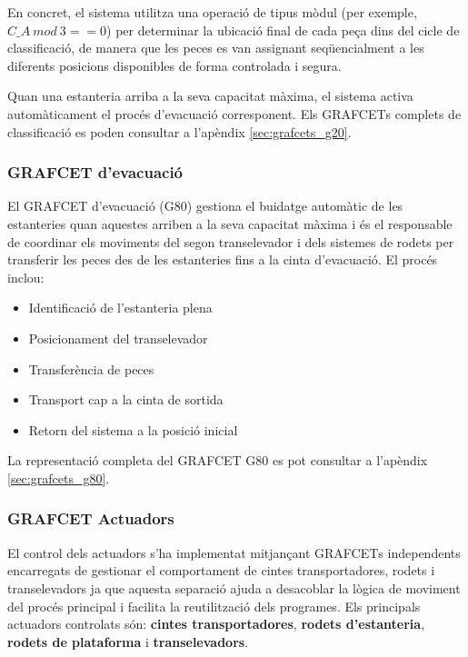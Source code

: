 \documentclass[a4paper,11pt,DIV=13,headings=normal,abstract=true,twoside=semi]{article}
\newcommand{\acro}[1]{\textsc{#1}}
\begin{document}
En concret, el sistema utilitza una operació de tipus mòdul (per exemple, $C\_A\ mod\ 3 ==0$) per determinar la ubicació final de cada peça dins del cicle de classificació, de manera que les peces es van assignant seqüencialment a les diferents posicions disponibles de forma controlada i segura. 

Quan una estanteria arriba a la seva capacitat màxima, el sistema activa automàticament el procés d'evacuació corresponent. Els \acro{GRAFCET}s complets de classificació es poden consultar a l'apèndix \ref{sec:grafcets_g20}.


\subsubsection{\acro{GRAFCET} d'evacuació}

El \acro{GRAFCET} d'evacuació (G80) gestiona el buidatge automàtic de les estanteries quan aquestes arriben a la seva capacitat màxima i és el responsable de coordinar els moviments del segon transelevador i dels sistemes de rodets per transferir les peces des de les estanteries fins a la cinta d'evacuació. El procés inclou:

\begin{itemize}
\item Identificació de l'estanteria plena
\item Posicionament del transelevador
\item Transferència de peces
\item Transport cap a la cinta de sortida
\item Retorn del sistema a la posició inicial
\end{itemize}

La representació completa del \acro{GRAFCET} G80 es pot consultar a l'apèndix \ref{sec:grafcets_g80}.

\subsubsection{\acro{GRAFCET} Actuadors}

El control dels actuadors s'ha implementat mitjançant \acro{GRAFCET}s independents encarregats de gestionar el comportament de cintes transportadores, rodets i transelevadors ja que aquesta separació ajuda a desacoblar la lògica de moviment del procés principal i facilita la reutilització dels programes. Els principals actuadors controlats són: \textbf{cintes transportadores}, \textbf{rodets d'estanteria}, \textbf{rodets de plataforma} i \textbf{transelevadors}.
\end{document}
